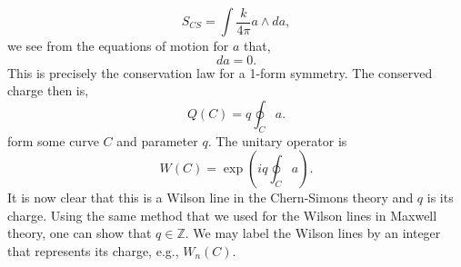 \documentclass{article}
\begin{document}
\begin{equation}
	S_{CS}=\int \frac{k}{4\pi}a\wedge da, 
\end{equation}
we see from the equations of motion for $a$ that, 
\begin{equation}
	da=0. 
\end{equation}
This is precisely the conservation law for a 1-form symmetry. The conserved charge then is,
\begin{equation}
	Q(C)=q\oint_C a.
\end{equation}
form some curve $C$ and parameter $q$. The unitary operator is 
\begin{equation}\label{wilson line cs}
	W(C)=\exp\left(iq\oint_C a\right).
\end{equation}
It is now clear that this is a Wilson line in the Chern-Simons theory and $q$ is its charge. Using the same method that we used for the Wilson lines in Maxwell theory, one can show that $q\in\mathbb{Z}$. We may label the Wilson lines by an integer that represents its charge, e.g., $W_n(C)$. 
\end{document}
